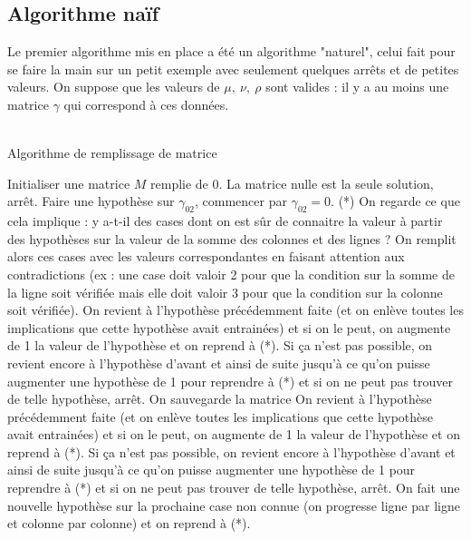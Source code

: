 \documentclass[12pt]{article}
\begin{document}
\subsection{Algorithme naïf}
Le premier algorithme mis en place a été un algorithme "naturel", celui fait pour se faire la main sur un petit exemple avec seulement quelques arrêts et de petites valeurs. On suppose que les valeurs de $\mu,\:\nu,\:\rho$ sont valides : il y a au moins une matrice $\gamma$ qui correspond à ces données.\\
\\
\begin{algorithm}
\caption{Algorithme de remplissage de matrice}
\begin{algorithmic}
    \State Initialiser une matrice $M$ remplie de 0.
        \State La matrice nulle est la seule solution, arrêt.
    \Else
        \State Faire une hypothèse sur $\gamma_{02}$, commencer par $\gamma_{02} = 0$.
        \State (*) On regarde ce que cela implique : y a-t-il des cases dont on est sûr de connaitre la valeur à partir des hypothèses sur la valeur de la somme des colonnes et des lignes ? On remplit alors ces cases avec les valeurs correspondantes en faisant attention aux contradictions (ex : une case doit valoir 2 pour que la condition sur la somme de la ligne soit vérifiée mais elle doit valoir 3 pour que la condition sur la colonne soit vérifiée).
            \State On revient à l’hypothèse précédemment faite (et on enlève toutes les implications que cette hypothèse avait entrainées) et si on le peut, on augmente de 1 la valeur de l’hypothèse et on reprend à (*). Si ça n’est pas possible, on revient encore à l’hypothèse d’avant et ainsi de suite jusqu’à ce qu’on puisse augmenter une hypothèse de 1 pour reprendre à (*) et si on ne peut pas trouver de telle hypothèse, arrêt.
        \Else
                \State On sauvegarde la matrice
                \State On revient à l’hypothèse précédemment faite (et on enlève toutes les implications que cette hypothèse avait entrainées) et si on le peut, on augmente de 1 la valeur de l’hypothèse et on reprend à (*). Si ça n’est pas possible, on revient encore à l’hypothèse d’avant et ainsi de suite jusqu’à ce qu’on puisse augmenter une hypothèse de 1 pour reprendre à (*) et si on ne peut pas trouver de telle hypothèse, arrêt.
             \Else
                \State On fait une nouvelle hypothèse sur la prochaine case non connue (on progresse ligne par ligne et colonne par colonne) et on reprend à (*).
            \EndIf
        \EndIf
    \EndIf
\end{algorithmic}
\end{algorithm}
\end{document}
